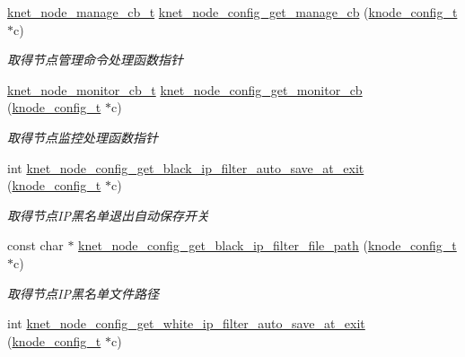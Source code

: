 \begin{DoxyCompactItemize}
\hyperlink{a00066_acd4bad75f444cb56dffa5f9413bbe456_acd4bad75f444cb56dffa5f9413bbe456}{knet\+\_\+node\+\_\+manage\+\_\+cb\+\_\+t} \hyperlink{a00105_a359b8c65262dd5f33717c59b895fdf05_a359b8c65262dd5f33717c59b895fdf05}{knet\+\_\+node\+\_\+config\+\_\+get\+\_\+manage\+\_\+cb} (\hyperlink{a00066_af1cfaee0eb1c76ebf06076b95cc47ee1_af1cfaee0eb1c76ebf06076b95cc47ee1}{knode\+\_\+config\+\_\+t} $\ast$c)
\begin{DoxyCompactList}\small\item\em 取得节点管理命令处理函数指针 \end{DoxyCompactList}\item 
\hyperlink{a00066_aabd13837697aceb20b2a2cb8908e79cd_aabd13837697aceb20b2a2cb8908e79cd}{knet\+\_\+node\+\_\+monitor\+\_\+cb\+\_\+t} \hyperlink{a00105_a95c9de27cbf0b374451dba2db035b9df_a95c9de27cbf0b374451dba2db035b9df}{knet\+\_\+node\+\_\+config\+\_\+get\+\_\+monitor\+\_\+cb} (\hyperlink{a00066_af1cfaee0eb1c76ebf06076b95cc47ee1_af1cfaee0eb1c76ebf06076b95cc47ee1}{knode\+\_\+config\+\_\+t} $\ast$c)
\begin{DoxyCompactList}\small\item\em 取得节点监控处理函数指针 \end{DoxyCompactList}\item 
int \hyperlink{a00105_a09597fd719f52f3993a7c818fb561227_a09597fd719f52f3993a7c818fb561227}{knet\+\_\+node\+\_\+config\+\_\+get\+\_\+black\+\_\+ip\+\_\+filter\+\_\+auto\+\_\+save\+\_\+at\+\_\+exit} (\hyperlink{a00066_af1cfaee0eb1c76ebf06076b95cc47ee1_af1cfaee0eb1c76ebf06076b95cc47ee1}{knode\+\_\+config\+\_\+t} $\ast$c)
\begin{DoxyCompactList}\small\item\em 取得节点\+I\+P黑名单退出自动保存开关 \end{DoxyCompactList}\item 
const char $\ast$ \hyperlink{a00105_a2f5df831f32251993337fb24e7e6224a_a2f5df831f32251993337fb24e7e6224a}{knet\+\_\+node\+\_\+config\+\_\+get\+\_\+black\+\_\+ip\+\_\+filter\+\_\+file\+\_\+path} (\hyperlink{a00066_af1cfaee0eb1c76ebf06076b95cc47ee1_af1cfaee0eb1c76ebf06076b95cc47ee1}{knode\+\_\+config\+\_\+t} $\ast$c)
\begin{DoxyCompactList}\small\item\em 取得节点\+I\+P黑名单文件路径 \end{DoxyCompactList}\item 
int \hyperlink{a00105_affa14ee8a62155ff27a1e49e09ae3779_affa14ee8a62155ff27a1e49e09ae3779}{knet\+\_\+node\+\_\+config\+\_\+get\+\_\+white\+\_\+ip\+\_\+filter\+\_\+auto\+\_\+save\+\_\+at\+\_\+exit} (\hyperlink{a00066_af1cfaee0eb1c76ebf06076b95cc47ee1_af1cfaee0eb1c76ebf06076b95cc47ee1}{knode\+\_\+config\+\_\+t} $\ast$c)

\end{DoxyCompactItemize}
